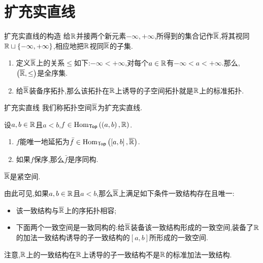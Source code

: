 \section{扩充实直线}

\begin{proposition}{扩充实直线的构造}{}
	给$\mathbb{R}$并接两个新元素$-\infty,+\infty$,所得到的集合记作$\overline{\mathbb{R}}$,将其视同$\mathbb{R}\sqcup\left\{-\infty,+\infty\right\}$,相应地把$\mathbb{R}$视同$\overline{\mathbb{R}}$的子集.
	\begin{enumerate}
		\item 定义$\overline{\mathbb{R}}$上的关系$\leq$如下:$-\infty<+\infty$,对每个$a\in\mathbb{R}$有$-\infty<a<+\infty$.那么,$\left(\overline{\mathbb{R}},\leq\right)$是全序集.
		\item 给$\overline{\mathbb{R}}$装备序拓扑,那么该拓扑在$\mathbb{R}$上诱导的子空间拓扑就是$\mathbb{R}$上的标准拓扑.
	\end{enumerate}
\end{proposition}

\begin{definition}{扩充实直线}{}
	我们称拓扑空间$\overline{\mathbb{R}}$为扩充实直线.
\end{definition}

\begin{proposition}{}{}
	设$a,b\in\mathbb{R}$且$a<b$,$f\in\operatorname{Hom}_{\mathsf{Top}}\left(\left(a,b\right),\mathbb{R}\right)$.
	\begin{enumerate}
		\item $f$能唯一地延拓为$\bar{f}\in\operatorname{Hom}_{\mathsf{Top}}\left(\left[a,b\right],\overline{\mathbb{R}}\right)$.
		\item 如果$f$保序,那么$\bar{f}$是序同构.
	\end{enumerate}
\end{proposition}

\begin{proposition}{}{}
	$\overline{\mathbb{R}}$是紧空间.
\end{proposition}

\begin{remark}{}{}
	由此可见,如果$a,b\in\mathbb{R}$且$a<b$,那么$\overline{\mathbb{R}}$上满足如下条件一致结构存在且唯一:
	\begin{itemize}
		\item 该一致结构与$\overline{\mathbb{R}}$上的序拓扑相容;
		\item 下面两个一致空间是一致同构的:给$\overline{\mathbb{R}}$装备该一致结构形成的一致空间,装备了$\mathbb{R}$的加法一致结构诱导的子一致结构的$\left[a,b\right]$所形成的一致空间.
	\end{itemize}
	注意,$\mathbb{R}$上的一致结构在$\mathbb{R}$上诱导的子一致结构不是$\mathbb{R}$的标准加法一致结构.
\end{remark}

